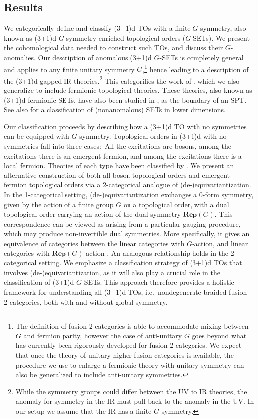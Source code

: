 \documentclass[11pt,reqno]{amsart}
\newcommand{\Rep}{\mathbf{Rep}}
\numberwithin{equation}{section}
\theoremstyle{plain}
\theoremstyle{definition}
\begin{document}
\subsection{Results}\label{subseciton:mainresults}
We categorically define and classify  (3+1)d TOs with a finite $G$-symmetry, also known as (3+1)d $G$-symmetry enriched topological orders ($G$-SETs). We present the cohomological data needed to construct such TOs, and discuss their $G$-anomalies. Our description of anomalous (3+1)d $G$-SETs  is completely general and applies to any finite unitary symmetry $G$,\footnote{The definition of fusion 2-categories is able to accommodate mixing between $G$ and fermion parity, however the case of anti-unitary $G$ goes beyond what has currently been rigorously developed for fusion 2-categories. We expect that once the theory of unitary higher fusion categories is available, the procedure we use to enlarge a fermionic theory with unitary symmetry can also be generalized to include anti-unitary symmetries.} hence leading to a description of the (3+1)d gapped IR theories.\footnote{While the symmetry groups could differ between the UV to IR theories, the anomaly for symmetry in the IR must pull back to the anomaly in the UV. In our setup we assume that the IR has a finite $G$-symmetry.} 
This categorifies the work of \cite{Barkeshli:2014cna}, which we also generalize to include fermionic topological theories.
These theories, also known as (3+1)d fermionic SETs, have also been studied in \cite{Yang:2023gvi,Cheng:2024awi}, as the boundary of an SPT. See also \cite{Kong:2020jne} for a classification of (nonanomalous) SETs in lower dimensions.

Our classification proceeds by describing how a (3+1)d TO with no symmetries can be equipped with $G$-symmetry. Topological orders in (3+1)d with no symmetries fall into three cases:\ All the excitations are bosons, among the excitations there is an emergent fermion, and among the excitations  there is a local fermion. Theories of each type have been classified by \cite{Kong:2014qka,kong2015boundary,kong2017boundary,Lan_2018,Lan_2019,JF}. 
We present an alternative construction of both all-boson topological orders and emergent-fermion topological orders via a 2-categorical analogue of (de-)equivariantization. In the 1-categorical setting, (de-)equivariantization exchanges a 0-form symmetry, given by the action of a finite group $G$ on a topological order, with a dual topological order carrying an action of the dual symmetry $\Rep(G)$. This correspondence can be viewed as arising from a particular gauging procedure, which may produce non-invertible dual symmetries. More specifically, it gives an equivalence of categories between the linear categories with $G$-action, and linear categories with $\Rep(G)$ action \cite{DGNO}. 
An analogous relationship holds in the 2-categorical setting.
We emphasize a classification strategy of (3+1)d TOs that involves (de-)equivariantization, as it will also play a crucial role in the classification of (3+1)d $G$-SETs. 
This approach therefore provides a holistic framework for understanding all (3+1)d TOs, i.e.\ nondegenerate braided fusion 2-categories, both with and without global symmetry.
\end{document}

